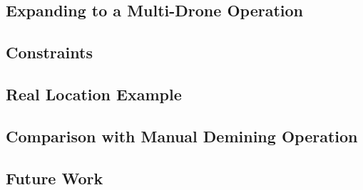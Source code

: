 \subsection{Expanding to a Multi-Drone Operation}

\subsection{Constraints}

\subsection{Real Location Example}

\subsection{Comparison with Manual Demining Operation}

\subsection{Future Work}
